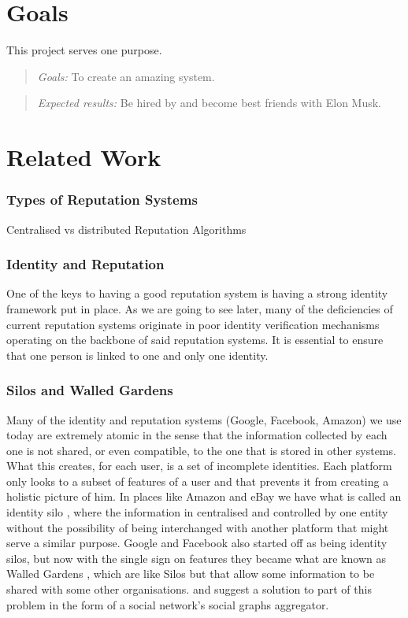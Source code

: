 \documentclass[llncsdoc]{llncs}
\begin{document}
\section{Goals}
\label{sec:goals}

This project serves one purpose.
 
\begin{quotation} 
\textit{Goals:} To create an amazing system.
\end{quotation} 
 
\begin{quotation} 
  \textit{Expected results:} Be hired by and become best friends with Elon Musk.
\end{quotation} 

\section{Related Work}
\label{sec:rwork}

\subsubsection{Types of Reputation Systems}
Centralised vs distributed
Reputation Algorithms



\subsubsection{Identity and Reputation}
One of the keys to having a good reputation system is having a strong identity framework put in place. As we are going to see later, many of the deficiencies of current reputation systems originate in poor identity verification mechanisms operating on the backbone of said reputation systems. It is essential to ensure that one person is linked to one and only one identity.

\subsubsection{Silos and Walled Gardens}
Many of the identity and reputation systems (Google, Facebook, Amazon) we use today are extremely atomic in the sense that the information collected by each one is not shared, or even compatible, to the one that is stored in other systems. What this creates, for each user, is a set of incomplete identities. Each platform only looks to a subset of features of a user and that prevents it from creating a holistic picture of him. In places like Amazon and eBay we have what is called an identity silo \cite{Pato:2017uw}, where the information in centralised and controlled by one entity without the possibility of being interchanged with another platform that might serve a similar purpose. Google and Facebook also started off as being identity silos, but now with the single sign on features \cite{Anonymous:MGy1lR79} they became what are known as Walled Gardens \cite{Pato:2017uw}, which are like Silos but that allow some information to be shared with some other organisations. \cite{Anonymous:PvP3cFwB} and \cite{Mostarda:2009te} suggest a solution to part of this problem in the form of a social network's social graphs aggregator. 
\end{document}
